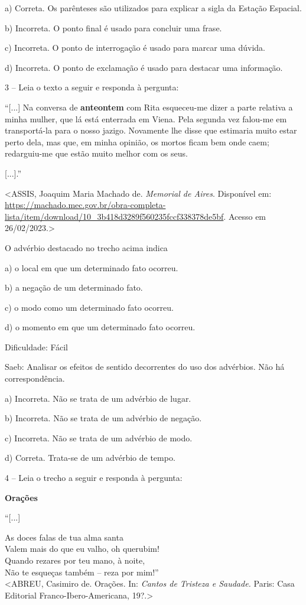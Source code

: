 a) Correta. Os parênteses são utilizados para explicar a sigla da
Estação Espacial.

b) Incorreta. O ponto final é usado para concluir uma frase.

c) Incorreta. O ponto de interrogação é usado para marcar uma dúvida.

d) Incorreta. O ponto de exclamação é usado para destacar uma
informação.

3 -- Leia o texto a seguir e responda à pergunta:

``{[}...{]} Na conversa de \textbf{anteontem} com Rita esqueceu-me dizer
a parte relativa a minha mulher, que lá está enterrada em Viena. Pela
segunda vez falou-me em transportá-la para o nosso jazigo. Novamente lhe
disse que estimaria muito estar perto dela, mas que, em minha opinião,
os mortos ficam bem onde caem; redarguiu-me que estão muito melhor com
os seus.

{[}...{]}.''

\textless{}ASSIS, Joaquim Maria Machado de. \emph{Memorial de Aires}.
Disponível em:
\url{https://machado.mec.gov.br/obra-completa-lista/item/download/10_3b418d3289f560235fccf338378de5bf}.
Acesso em 26/02/2023.\textgreater{}

O advérbio destacado no trecho acima indica

a) o local em que um determinado fato ocorreu.

b) a negação de um determinado fato.

c) o modo como um determinado fato ocorreu.

d) o momento em que um determinado fato ocorreu.

Dificuldade: Fácil

Saeb: Analisar os efeitos de sentido decorrentes do uso dos advérbios.
Não há correspondência.

a) Incorreta. Não se trata de um advérbio de lugar.

b) Incorreta. Não se trata de um advérbio de negação.

c) Incorreta. Não se trata de um advérbio de modo.

d) Correta. Trata-se de um advérbio de tempo.

4 -- Leia o trecho a seguir e responda à pergunta:

\textbf{Orações}

``{[}...{]}

As doces falas de tua alma santa\\
Valem mais do que eu valho, oh querubim!\\
Quando rezares por teu mano, à noite,\\
Não te esqueças também -- reza por mim!''\\
\textless{}ABREU, Casimiro de. Orações. In: \emph{Cantos de Tristeza e
Saudade.} Paris: Casa Editorial Franco-Ibero-Americana,
19?.\textgreater{}

